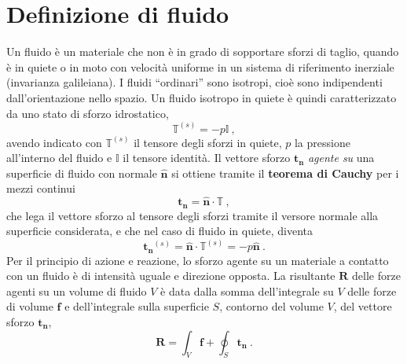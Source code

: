 %
\section{Definizione di fluido}
Un fluido è un materiale che non è in grado di sopportare sforzi di taglio, quando è in quiete o in moto con velocità uniforme in un sistema di riferimento inerziale (invarianza galileiana).
I fluidi ``ordinari'' sono isotropi, cioè sono indipendenti dall'orientazione nello spazio.
Un fluido isotropo in quiete è quindi caratterizzato da uno stato di sforzo idrostatico,
\begin{equation}
 \mathbb{T}^{(s)} = - p \mathbb{I} \ ,
\end{equation}
avendo indicato con $\mathbb{T}^{(s)}$ il tensore degli sforzi in quiete, $p$ la pressione all'interno del fluido e $\mathbb{I}$ il tensore identità. Il vettore sforzo $\bm{t_n}$ \textit{agente su} una superficie di fluido con normale $\bm{\hat{n}}$ si ottiene tramite il \textbf{teorema di Cauchy} per i mezzi continui
\begin{equation}
 \bm{t_n} = \bm{\hat{n}} \cdot \mathbb{T} \ ,
\end{equation}
 che lega il vettore sforzo al tensore degli sforzi tramite il versore normale alla superficie considerata, e che nel caso di fluido in quiete, diventa
\begin{equation}
 \bm{t_n}^{(s)} = \bm{\hat{n}} \cdot \mathbb{T}^{(s)}  = - p \bm{\hat{n}} \ .
\end{equation} 
Per il principio di azione e reazione, lo sforzo agente su un materiale a contatto con un fluido è di intensità uguale e direzione opposta. La risultante $\bm{R}$ delle forze agenti su un volume di fluido $V$ è data dalla somma dell'integrale su $V$ delle forze di volume $\bm{f}$ e dell'integrale sulla superficie $S$, contorno del volume $V$, del vettore sforzo $\bm{t_n}$,
\begin{equation}
 \bm{R} = \int_V \bm{f} + \oint_S \bm{t_n} \ . 
\end{equation}

%
